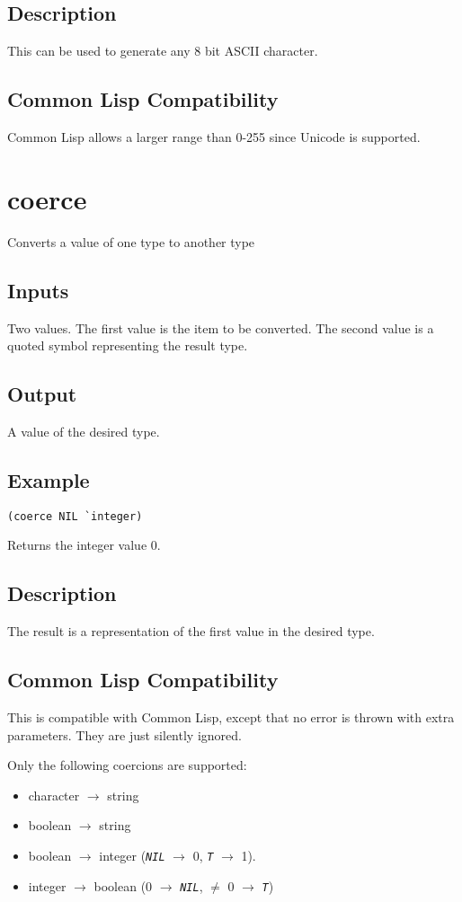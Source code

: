 \documentclass[10pt, openany]{book}
\newcommand{\constant}[1]{\emph{\texttt{#1}}}
\newcommand{\cl}{Common Lisp}
\begin{document}
\subsection{Description}
This can be used to generate any 8 bit ASCII character.
\subsection{Common Lisp Compatibility}
\cl{} allows a larger range than 0-255 since Unicode is supported.

\section{coerce}
Converts a value of one type to another type
\subsection{Inputs}
Two values.  The first value is the item to be converted.  The second value is a quoted symbol representing the result type.
\subsection{Output}
A value of the desired type.
\subsection{Example}
\begin{lstlisting}
(coerce NIL `integer)
\end{lstlisting}
Returns the integer value 0.
\subsection{Description}
The result is a representation of the first value in the desired type.
\subsection{Common Lisp Compatibility}
This is compatible with \cl, except that no error is thrown with extra parameters.  They are just silently ignored.

Only the following coercions are supported:
\begin{itemize}
  \item character $\rightarrow$ string
  \item boolean $\rightarrow$ string
  \item boolean $\rightarrow$ integer (\constant{NIL} $\rightarrow$ 0, \constant{T} $\rightarrow$ 1).
  \item integer $\rightarrow$ boolean (0 $\rightarrow$ \constant{NIL}, $\neq$ 0 $\rightarrow$ \constant{T})
\end{itemize}
\end{document}

